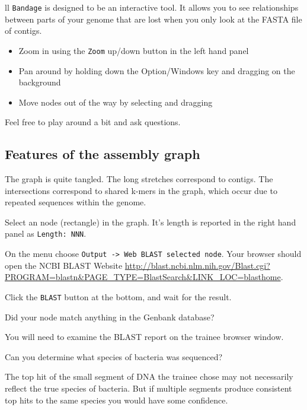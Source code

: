 \begin{table}[H]
\begin{tabular}{ll}
\texttt{Bandage} is designed to be an interactive tool. It allows you to see
relationships between parts of your genome that are lost when you
 only look at the FASTA file of contigs.
\begin{itemize}
\item Zoom in using the \texttt{Zoom} up/down button in the left hand panel
\item Pan around by holding down the Option/Windows key and dragging on the background
\item Move nodes out of the way by selecting and dragging
\end{itemize}
Feel free to play around a bit and ask questions.

\subsection{Features of the assembly graph}
The graph is quite tangled. The long stretches correspond to contigs.
The intersections correspond to shared k-mers in the graph, which occur
due to repeated sequences within the genome.
\begin{steps}
\item Select an node (rectangle) in the graph. It's length is reported in the right hand panel as \texttt{Length: NNN}.
\item On the menu choose \texttt{Output -> Web BLAST selected node}. Your browser should open the
   NCBI BLAST Website \url{http://blast.ncbi.nlm.nih.gov/Blast.cgi?PROGRAM=blastn&PAGE_TYPE=BlastSearch&LINK_LOC=blasthome}.
\item Click the \texttt{BLAST} button at the bottom, and wait for the result.
\end{steps}

\begin{questions}
Did your node match anything in the Genbank database? \\
\begin{answer}
You will need to examine the BLAST report on the trainee browser window.
\end{answer}
Can you determine what species of bacteria was sequenced? \\
\begin{answer}
The top hit of the small segment of DNA the trainee chose may not necessarily
reflect the true species of bacteria. But if multiple segments produce consistent
top hits to the same species you would have some confidence.
\end{answer}
\end{questions}


\end{tabular}
\end{table}
